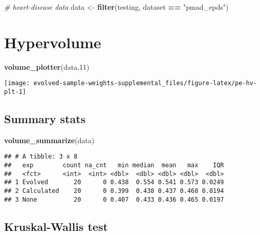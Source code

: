 \documentclass[
]{book}
\newenvironment{Shaded}{\begin{snugshade}}{\end{snugshade}}
\newcommand{\CommentTok}[1]{\textcolor[rgb]{0.56,0.35,0.01}{\textit{#1}}}
\newcommand{\DecValTok}[1]{\textcolor[rgb]{0.00,0.00,0.81}{#1}}
\newcommand{\FunctionTok}[1]{\textcolor[rgb]{0.13,0.29,0.53}{\textbf{#1}}}
\newcommand{\NormalTok}[1]{#1}
\newcommand{\OtherTok}[1]{\textcolor[rgb]{0.56,0.35,0.01}{#1}}
\newcommand{\SpecialCharTok}[1]{\textcolor[rgb]{0.81,0.36,0.00}{\textbf{#1}}}
\newcommand{\StringTok}[1]{\textcolor[rgb]{0.31,0.60,0.02}{#1}}
\begin{document}
\begin{Shaded}
\begin{Highlighting}[]
\CommentTok{\# heart{-}disease data}
\NormalTok{data }\OtherTok{\textless{}{-}} \FunctionTok{filter}\NormalTok{(testing, dataset }\SpecialCharTok{==} \StringTok{"pmad\_epds"}\NormalTok{)}
\end{Highlighting}
\end{Shaded}

\hypertarget{hypervolume-10}{%
\section{Hypervolume}\label{hypervolume-10}}

\begin{Shaded}
\begin{Highlighting}[]
\FunctionTok{volume\_plotter}\NormalTok{(data,}\DecValTok{11}\NormalTok{)}
\end{Highlighting}
\end{Shaded}

\texttt{[image: evolved-sample-weights-supplemental\_files/figure-latex/pe-hv-plt-1]}

\hypertarget{summary-stats-10}{%
\subsection{Summary stats}\label{summary-stats-10}}

\begin{Shaded}
\begin{Highlighting}[]
\FunctionTok{volume\_summarize}\NormalTok{(data)}
\end{Highlighting}
\end{Shaded}

\begin{verbatim}
## # A tibble: 3 x 8
##   exp        count na_cnt   min median  mean   max    IQR
##   <fct>      <int>  <int> <dbl>  <dbl> <dbl> <dbl>  <dbl>
## 1 Evolved       20      0 0.438  0.554 0.541 0.573 0.0249
## 2 Calculated    20      0 0.399  0.438 0.437 0.468 0.0194
## 3 None          20      0 0.407  0.433 0.436 0.465 0.0197
\end{verbatim}

\hypertarget{kruskal-wallis-test-10}{%
\subsection{Kruskal-Wallis test}\label{kruskal-wallis-test-10}}
\end{document}
